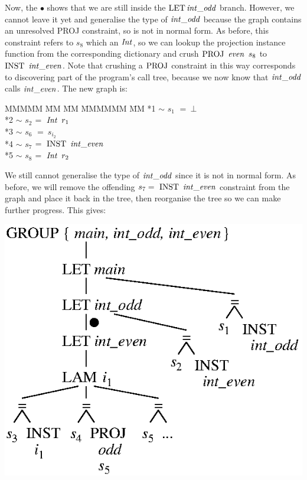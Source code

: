 Now, the $\bullet$ shows that we are still inside the $\textrm{LET} \operatorname{\mathit{int\_odd}}$ branch. However, we cannot leave it yet and generalise the type of $\operatorname{\mathit{int\_odd}}$ because the graph contains an unresolved PROJ constraint, so is not in normal form. As before, this constraint refers to $s_8$ which an $\operatorname{\mathit{Int}}$, so we can lookup the projection instance function from the corresponding dictionary and crush $\textrm{PROJ} \ \operatorname{\mathit{even}} \ s_8$ to $\textrm{INST} \ \operatorname{\mathit{int\_even}}$. Note that crushing a $\textrm{PROJ}$ constraint in this way corresponds to discovering part of the program's call tree, because we now know that $\operatorname{\mathit{int\_odd}}$ calls $\operatorname{\mathit{int\_even}}$. The new graph is:
\begin{tabbing}
MMMMM	\= MM 	\= MM 		\= MMMMMM 	\= MM \kill
	\> *1	\> $\sim$	\> $s_1$	\> $= \ \bot$ \\
	\> *2	\> $\sim$	\> $s_2$	\> $= \ \operatorname{\mathit{Int}}  \ r_1$ \\
	\> *3	\> $\sim$	\> $s_6$	\> $= \ s_{i_2}$ \\
	\> *4	\> $\sim$	\> $s_7$	\> $= \ \textrm{INST} \ \operatorname{\mathit{int\_even}}$ \\
	\> *5	\> $\sim$	\> $s_8$	\> $= \ \operatorname{\mathit{Int}} \ r_2$
\end{tabbing}
We still cannot generalise the type of $\operatorname{\mathit{int\_odd}}$ since it is not in normal form. As before, we will remove the offending $s_7 = \ \rINST \ \iintEven$ constraint from the graph and place it back in the tree, then reorganise the tree so we can make further progress. This gives:

\begin{center}
\includegraphics{3-Inference/fig/ordering/tree-intodd-gen-moved}
\end{center}

